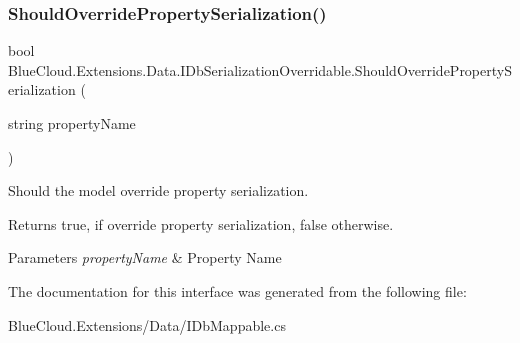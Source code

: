\subsubsection{\texorpdfstring{Should\+Override\+Property\+Serialization()}{ShouldOverridePropertySerialization()}}
{\footnotesize\ttfamily bool Blue\+Cloud.\+Extensions.\+Data.\+I\+Db\+Serialization\+Overridable.\+Should\+Override\+Property\+Serialization (\begin{DoxyParamCaption}\item[{string}]{property\+Name }\end{DoxyParamCaption})}



Should the model override property serialization. 

\begin{DoxyReturn}{Returns}
{\ttfamily true}, if override property serialization, {\ttfamily false} otherwise.
\end{DoxyReturn}

\begin{DoxyParams}{Parameters}
{\em property\+Name} & Property Name\\
\hline
\end{DoxyParams}


The documentation for this interface was generated from the following file\+:\begin{DoxyCompactItemize}
\item 
Blue\+Cloud.\+Extensions/\+Data/I\+Db\+Mappable.\+cs\end{DoxyCompactItemize}
